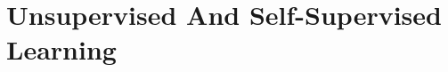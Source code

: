 \documentclass[main]{subfiles}
\begin{document}
\newpage
\section{Unsupervised And Self-Supervised Learning}
\end{document}
